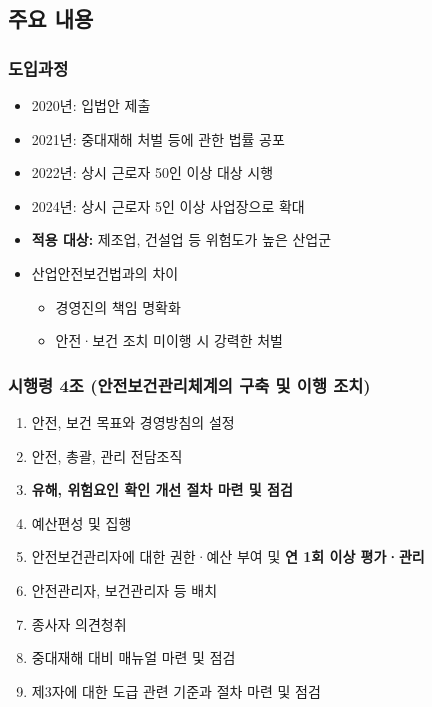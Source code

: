 \documentclass[aspectratio=169,xcolor=dvipsnames,handout]{beamer}
\begin{document}
\subsection{주요 내용}
\begin{frame}
    \frametitle{도입과정}
    \begin{itemize}
        \item 2020년: 입법안 제출
        \item 2021년: 중대재해 처벌 등에 관한 법률 공포
        \item 2022년: 상시 근로자 50인 이상 대상 시행
        \item 2024년: 상시 근로자 5인 이상 사업장으로 확대
        \item \textbf{적용 대상:} 제조업, 건설업 등 위험도가 높은 산업군
        \item 산업안전보건법과의 차이
            \begin{itemize}[<+->]
                \item 경영진의 책임 명확화
                \item 안전·보건 조치 미이행 시 강력한 처벌
            \end{itemize}
    \end{itemize}
\end{frame}

\begin{frame}
    \frametitle{시행령 4조 (안전보건관리체계의 구축 및 이행 조치)}
        \begin{enumerate}
            \small
            \item 안전, 보건 목표와 경영방침의 설정
            \item 안전, 총괄, 관리 전담조직
            \item \textbf{유해, 위험요인 확인 개선 절차 마련 및 점검}
            \item 예산편성 및 집행
            \item 안전보건관리자에 대한 권한·예산 부여 및 \textbf{연 1회 이상 평가·관리}
            \item 안전관리자, 보건관리자 등 배치
            \item 종사자 의견청취
            \item 중대재해 대비 매뉴얼 마련 및 점검
            \item 제3자에 대한 도급 관련 기준과 절차 마련 및 점검
        \end{enumerate}
\end{frame}
\end{document}
